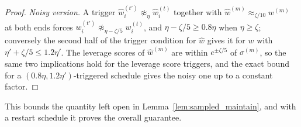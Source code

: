 \documentclass[11pt]{article}
\newcommand{\what}{\widehat{w}}
\begin{document}
\begin{proof}
\emph{Noisy version.}
A trigger $\what^{(t')}_i \not\approx_{\eta} \what^{(t)}_i$ together with
$\what^{(m)} \approx_{\zeta / 10} w^{(m)}$ at both ends forces
$w^{(t')}_i \not\approx_{\eta - \zeta / 5} w^{(t)}_i$, and
$\eta - \zeta / 5 \ge 0.8 \eta$ when
$\eta \ge \zeta$; conversely the second half of the trigger condition for
$\what$ gives it for
$w$ with
$\eta' + \zeta / 5 \le 1.2 \eta'$.
The leverage scores of $\what^{(m)}$ are within
$e^{\pm \zeta / 5}$ of
$\sigma^{(m)}$, so the same two implications hold for the leverage score
triggers, and the exact bound for a $(0.8 \eta, 1.2 \eta')$-triggered schedule
gives the noisy one up to a constant factor.
\end{proof}

This bounds the quantity left open in Lemma~\ref{lem:sampled_maintain}, and with
a restart schedule it proves the overall guarantee.
\end{document}
